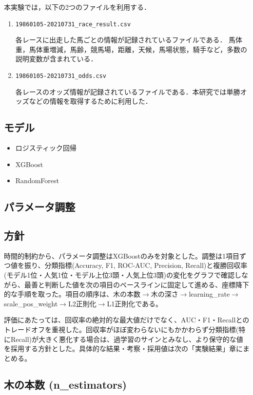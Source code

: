\documentclass[dvipdfmx, a4paper, 11pt, titlepage]{jsarticle}
\begin{document}
本実験では，以下の2つのファイルを利用する．


\begin{enumerate}
    \item \texttt{19860105-20210731\_race\_result.csv}

    各レースに出走した馬ごとの情報が記録されているファイルである．
    馬体重，馬体重増減，馬齢，競馬場，距離，天候，馬場状態，騎手など，多数の説明変数が含まれている．

    \item \texttt{19860105-20210731\_odds.csv}

    各レースのオッズ情報が記録されているファイルである．本研究では単勝オッズなどの情報を取得するために利用した．
\end{enumerate}

\subsection{モデル}
\begin{itemize}
 \item ロジスティック回帰
 \item XGBoost
 \item RandomForest
 \end{itemize}


\subsection{パラメータ調整}

\subsection{方針}
 
時間的制約から、パラメータ調整はXGBoostのみを対象とした。調整は1項目ずつ値を振り、分類指標(Accuracy, F1, ROC-AUC, Precision, Recall)と複勝回収率(モデル1位・人気1位・モデル上位3頭・人気上位3頭)の変化をグラフで確認しながら、最善と判断した値を次の項目のベースラインに固定して進める、座標降下的な手順を取った。項目の順序は、木の本数$\to$木の深さ$\to$learning\_rate$\to$scale\_pos\_weight$\to$L2正則化$\to$L1正則化である。
 
評価にあたっては、回収率の絶対的な最大値だけでなく、AUC・F1・Recallとのトレードオフを重視した。回収率がほぼ変わらないにもかかわらず分類指標(特にRecall)が大きく悪化する場合は、過学習のサインとみなし、より保守的な値を採用する方針とした。具体的な結果・考察・採用値は次の「実験結果」章にまとめる。
 
\subsection{木の本数 (n\_estimators)}
 
\end{document}
